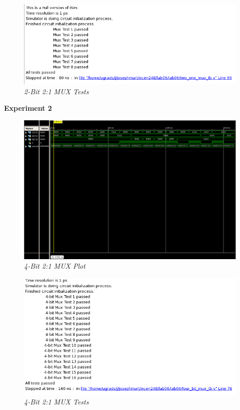 \documentclass[a4paper,12pt]{article}
\begin{document}
\begin{figure}[h]
  \begin{center}
    \includegraphics[scale=1]{2_1MuxTests.png}
    \caption{\textit{2-Bit 2:1 MUX Tests}}
  \end{center}
\end{figure}

\newpage

\hspace{-15pt}\textbf{Experiment 2}

\begin{figure}[h]
  \begin{center}
    \includegraphics[scale=0.5]{4_1MuxPlot.png}
    \caption{\textit{4-Bit 2:1 MUX Plot}}
  \end{center}
\end{figure}

\begin{figure}[h]
  \begin{center}
    \includegraphics[scale=0.65]{4_1MuxTests.png}
    \caption{\textit{4-Bit 2:1 MUX Tests}}
  \end{center}
\end{figure}
\end{document}

